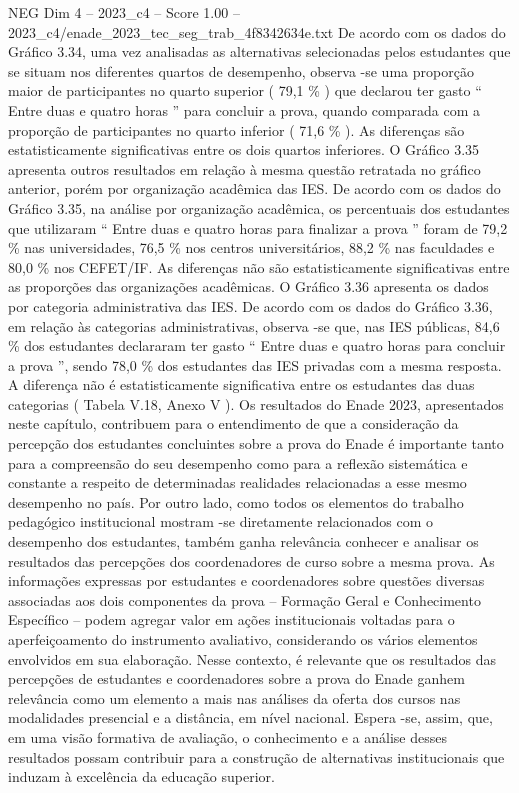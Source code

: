 \begin{textsample}{NEG Dim 4 – 2023\_c4 – Score 1.00 – 2023\_c4/enade\_2023\_tec\_seg\_trab\_4f8342634e.txt}
De acordo com os dados do Gráfico 3.34, uma vez analisadas as alternativas selecionadas pelos estudantes que se situam nos diferentes quartos de desempenho, observa -se uma proporção maior de participantes no quarto superior ( 79,1 \% ) que declarou ter gasto “ Entre duas e quatro horas ” para concluir a prova, quando comparada com a proporção de participantes no quarto inferior ( 71,6 \% ).
As diferenças são estatisticamente significativas entre os dois quartos inferiores.
O Gráfico 3.35 apresenta outros resultados em relação à mesma questão retratada no gráfico anterior, porém por organização acadêmica das IES.
De acordo com os dados do Gráfico 3.35, na análise por organização acadêmica, os percentuais dos estudantes que utilizaram “ Entre duas e quatro horas para finalizar a prova ” foram de 79,2 \% nas universidades, 76,5 \% nos centros universitários, 88,2 \% nas faculdades e 80,0 \% nos CEFET/IF.
As diferenças não são estatisticamente significativas entre as proporções das organizações acadêmicas.
O Gráfico 3.36 apresenta os dados por categoria administrativa das IES.
De acordo com os dados do Gráfico 3.36, em relação às categorias administrativas, observa -se que, nas IES públicas, 84,6 \% dos estudantes declararam ter gasto “ Entre duas e quatro horas para concluir a prova ”, sendo 78,0 \% dos estudantes das IES privadas com a mesma resposta.
A diferença não é estatisticamente significativa entre os estudantes das duas categorias ( Tabela V.18, Anexo V ).
Os resultados do Enade 2023, apresentados neste capítulo, contribuem para o entendimento de que a consideração da percepção dos estudantes concluintes sobre a prova do Enade é importante tanto para a compreensão do seu desempenho como para a reflexão sistemática e constante a respeito de determinadas realidades relacionadas a esse mesmo desempenho no país.
Por outro lado, como todos os elementos do trabalho pedagógico institucional mostram -se diretamente relacionados com o desempenho dos estudantes, também ganha relevância conhecer e analisar os resultados das percepções dos coordenadores de curso sobre a mesma prova.
As informações expressas por estudantes e coordenadores sobre questões diversas associadas aos dois componentes da prova – Formação Geral e Conhecimento Específico – podem agregar valor em ações institucionais voltadas para o aperfeiçoamento do instrumento avaliativo, considerando os vários elementos envolvidos em sua elaboração.
Nesse contexto, é relevante que os resultados das percepções de estudantes e coordenadores sobre a prova do Enade ganhem relevância como um elemento a mais nas análises da oferta dos cursos nas modalidades presencial e a distância, em nível nacional.
Espera -se, assim, que, em uma visão formativa de avaliação, o conhecimento e a análise desses resultados possam contribuir para a construção de alternativas institucionais que induzam à excelência da educação superior.

\end{textsample}
